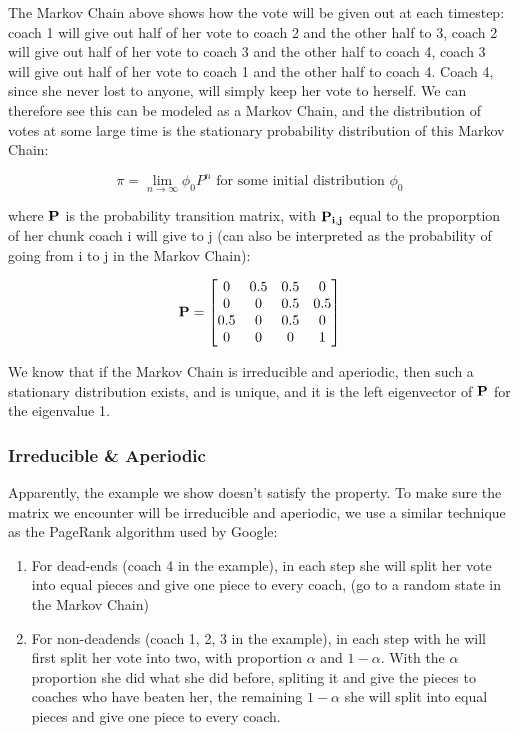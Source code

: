 \documentclass[titlepage]{article}
\begin{document}
\noindent The Markov Chain above shows how the vote will be given out at each timestep: coach 1 will give out half of her vote to coach 2 and the other half to 3, coach 2 will give out half of her vote to coach 3 and the other half to coach 4, coach 3 will give out half of her vote to coach 1 and the other half to coach 4. Coach 4, since she never lost to anyone, will simply keep her vote to herself. We can therefore see this can be modeled as a Markov Chain, and the distribution of votes at some large time is the stationary probability distribution of this Markov Chain:

$$ \pi = \lim_{n \rightarrow \infty} \phi_{0} P^n \mbox{ for some initial distribution } \phi_{0}$$

\noindent where $\bf{P}$ is the probability transition matrix, with $\bf{P}_{i,j}$ equal to the proporption of her chunk coach i will give to j (can also be interpreted as the probability of going from i to j in the Markov Chain):

\[
\bf{P} = 
\begin{bmatrix}
0 & 0.5 & 0.5 & 0 \\
0 & 0 & 0.5 & 0.5 \\
0.5 & 0 & 0.5 & 0 \\
0 & 0 & 0 & 1
\end{bmatrix}
\]

\noindent We know that if the Markov Chain is irreducible and aperiodic, then such a stationary distribution exists, and is unique, and it is the left eigenvector of $\bf{P}$ for the eigenvalue 1.


\subsubsection*{Irreducible \& Aperiodic}

\noindent Apparently, the example we show doesn't satisfy the property. To make sure the matrix we encounter will be irreducible and aperiodic, we use a similar technique as the PageRank algorithm used by Google:

\begin{enumerate}
\item For dead-ends (coach 4 in the example), in each step she will split her vote into equal pieces and give one piece to every coach, (go to a random state in the Markov Chain)
\item For non-deadends (coach 1, 2, 3 in the example), in each step with he will first split her vote into two, with proportion $\alpha$ and $1 - \alpha$. With the $\alpha$ proportion she did what she did before, spliting it and give the pieces to coaches who have beaten her, the remaining $1 - \alpha$ she will split into equal pieces and give one piece to every coach.
\end{enumerate}
\end{document}
